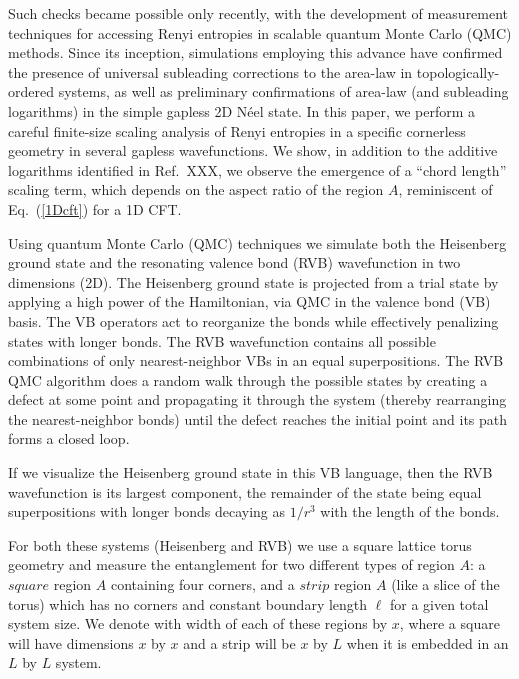 \documentclass[prl,aps,twocolumn,floatfix,amsmath,amssymb,superscriptaddress,tightenlines]{revtex4}
\begin{document}
Such checks became possible only recently, with the development of measurement techniques for accessing Renyi entropies in scalable quantum Monte Carlo (QMC) methods.  Since its inception, simulations employing this advance have confirmed the presence of universal subleading corrections to the area-law in topologically-ordered systems, as well as preliminary confirmations of area-law (and subleading logarithms) in the simple gapless 2D N\'eel state.  In this paper, we perform a careful finite-size scaling analysis of Renyi entropies in a specific cornerless geometry in several gapless wavefunctions.  We show, in addition to the additive logarithms identified in Ref.~XXX, we observe the emergence of a ``chord length'' scaling term, which depends on the {\color{red} aspect ratio} of the region $A$, reminiscent of Eq.~(\ref{1Dcft}) for a 1D CFT.


Using quantum Monte Carlo (QMC) techniques we simulate both the Heisenberg ground state and the resonating valence bond (RVB) wavefunction in two dimensions (2D). 
The Heisenberg ground state is projected from a trial state by applying a high power of the Hamiltonian, via QMC in the valence bond (VB) basis.\cite{Sandvik_VBQMC}
The VB operators act to reorganize the bonds while effectively penalizing states with longer bonds.
The RVB wavefunction contains all possible combinations of only nearest-neighbor VBs in an equal superpositions.
The RVB QMC algorithm does a random walk through the possible states by creating a defect at some point and propagating it through the system (thereby rearranging the nearest-neighbor bonds) until the defect reaches the initial point and its path forms a closed loop.

If we visualize the Heisenberg ground state in this VB language, then the RVB wavefunction is its largest component, the remainder of the state being equal superpositions with longer bonds decaying as $1/r^3$ \cite{Sandvik_VB_decay} with the length of the bonds.

For both these systems (Heisenberg and RVB) we use a square lattice torus geometry and measure the entanglement for two different types of region $A$:
a $square$ region $A$ containing four corners, and a $strip$ region $A$ (like a slice of the torus) which has no corners and constant boundary length $\ell$ for a given total system size.
We denote with width of each of these regions by $x$, where a square will have dimensions $x$ by $x$ and a strip will be $x$ by $L$ when it is embedded in an $L$ by $L$ system.
\end{document}
